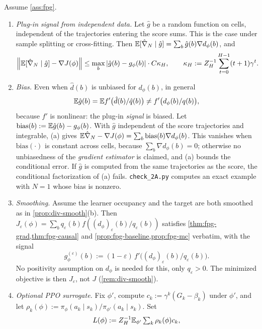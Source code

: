 \begin{proposition}\label{prop:fpg-approx}
Assume \cref{ass:fpg}.
\begin{enumerate}[nosep,label=(\alph*)]
\item \emph{Plug-in signal from independent data.} Let $\hat g$ be a random function on cells, independent of the trajectories entering the score sums. This is the case under sample splitting or cross-fitting.
  Then $\mathbb{E}[\hat\nabla_N\mid\hat g]=\sum_b\hat g(b)\nabla d_\phi(b)$, and
  \[
  \Big\|\mathbb{E}[\hat\nabla_N\mid\hat g]-\nabla J(\phi)\Big\|\le\max_b|\hat g(b)-g_\phi(b)|\cdot C\kappa_H,\qquad
  \kappa_H:=Z_H^{-1}\sum_{t=0}^{H-1}(t+1)\gamma^t.
  \]
\item \emph{Bias.} Even when $\hat d(b)$ is unbiased for $d_\phi(b)$, in general
  \[
  \mathbb{E}\hat g(b)=\mathbb{E} f'\big(\hat d(b)/\hat q(b)\big)\ne f'\big(d_\phi(b)/q(b)\big),
  \]
  because $f'$ is nonlinear: the plug-in \emph{signal} is biased.
  Let $\mathrm{bias}(b):=\mathbb{E}\hat g(b)-g_\phi(b)$. With $\hat g$ independent of the score trajectories and integrable, (a) gives $\mathbb{E}\hat\nabla_N-\nabla J(\phi)=\sum_b\mathrm{bias}(b)\nabla d_\phi(b)$.
  This vanishes when $\mathrm{bias}(\cdot)$ is constant across cells, because $\sum_b\nabla d_\phi(b)=0$; otherwise no unbiasedness of the \emph{gradient estimator} is claimed, and (a) bounds the conditional error.
  If $\hat g$ is computed from the same trajectories as the score, the conditional factorization of (a) fails. \texttt{check\_2A.py} computes an exact example with $N=1$ whose bias is nonzero.
\item \emph{Smoothing.} Assume the learner occupancy and the target are both smoothed as in \cref{prop:div-smooth}(b).
  Then $J_\varepsilon(\phi)=\sum_bq_\varepsilon(b)f((d_\phi)_\varepsilon(b)/q_\varepsilon(b))$ satisfies \cref{thm:fpg-grad,thm:fpg-causal} and \cref{prop:fpg-baseline,prop:fpg-mc} verbatim, with the signal
  \[
  g^{(\varepsilon)}_\phi(b):=(1-\varepsilon)\,f'\big((d_\phi)_\varepsilon(b)/q_\varepsilon(b)\big).
  \] No positivity assumption on $d_\phi$ is needed for this, only $q_\varepsilon>0$.
  The minimized objective is then $J_\varepsilon$, not $J$ (\cref{rem:div-smooth}).
\item \emph{Optional PPO surrogate.} Fix $\phi'$, compute $c_k:=\gamma^k(G_k-\beta_k)$ under $\phi'$, and let $\rho_k(\phi):=\pi_\phi(a_k\mid s_k)/\pi_{\phi'}(a_k\mid s_k)$.
  Set
  \begin{align*}
  L(\phi)&:=Z_H^{-1}\E_{\phi'}\textstyle\sum_k\rho_k(\phi)c_k,\\

\end{align*}
\end{enumerate}
\end{proposition}
